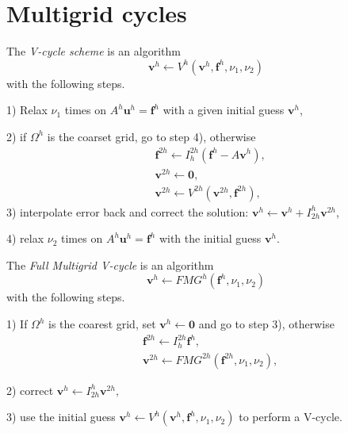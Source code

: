 \section{Multigrid cycles}
\label{sec:multigrid-cycles}
\begin{defn}
  The \emph{V-cycle scheme} is an algorithm
  \begin{equation}
    \mathbf{v}^h\leftarrow V^h(\mathbf{v}^h,\mathbf{f}^h,\nu_1,\nu_2)
  \end{equation}
  with the following steps.
  
  1) Relax $\nu_1$ times on $A^h\mathbf{u}^h=\mathbf{f}^h$
  with a given initial guess $\mathbf{v}^h$,

  2) if $\Omega^h$ is the coarset grid,
  go to step 4), otherwise
  \begin{equation*}
    \begin{aligned}
      &\mathbf{f}^{2h}\leftarrow
        I^{2h}_h(\mathbf{f}^h-A\mathbf{v}^h),\\
        &\mathbf{v}^{2h}\leftarrow \mathbf{0},\\
        &\mathbf{v}^{2h}\leftarrow V^{2h}(\mathbf{v}^{2h},\mathbf{f}^{2h}),
    \end{aligned}
  \end{equation*}
  3) interpolate error back and correct the solution:
  $\mathbf{v}^h\leftarrow \mathbf{v}^h+I^h_{2h}\mathbf{v}^{2h}$,

  4) relax $\nu_2$ times on $A^h\mathbf{u}^h=\mathbf{f}^h$
  with the initial guess $\mathbf{v}^h$.
\end{defn}

\begin{defn}
  The \emph{Full Multigrid V-cycle} is an algorithm
  \begin{equation}
    \mathbf{v}^h\leftarrow FMG^h(\mathbf{f}^h,\nu_1,\nu_2)
  \end{equation}
  with the following steps.

  1) If $\Omega^h$ is the coarest grid,
  set $\mathbf{v}^h\leftarrow \mathbf{0}$ and go to step 3),
  otherwise
  \begin{equation*}
    \begin{aligned}
      &\mathbf{f}^{2h}\leftarrow I^{2h}_h\mathbf{f}^h,\\
      &\mathbf{v}^{2h}\leftarrow FMG^{2h}(\mathbf{f}^{2h},\nu_1,\nu_2),
    \end{aligned}
  \end{equation*}
  
  2) correct $ \mathbf{v}^h\leftarrow I^h_{2h}\mathbf{v}^{2h},$

  3)%
  use the initial guess
  $\mathbf{v}^h\leftarrow V^h(\mathbf{v}^h,\mathbf{f}^h,\nu_1,\nu_2)$
  to perform a V-cycle.
\end{defn}

